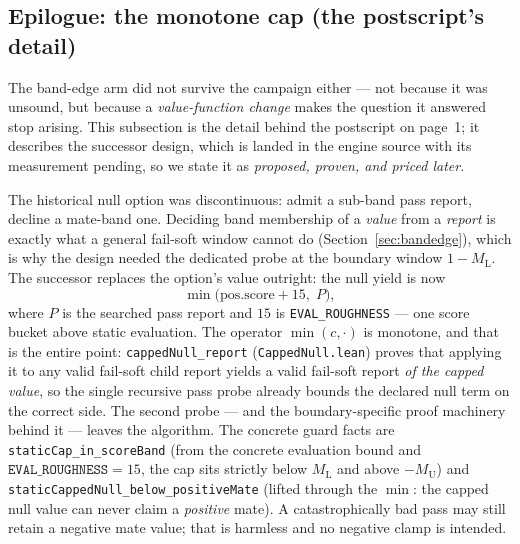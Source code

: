 \documentclass[11pt]{article}
\newcommand{\MU}{M_{\mathrm{U}}}    %
\newcommand{\ML}{M_{\mathrm{L}}}    %
\theoremstyle{plain}
\theoremstyle{definition}
\theoremstyle{remark}
\begin{document}
\subsection{Epilogue: the monotone cap (the postscript's detail)}
\label{sec:cappednull}

The band-edge arm did not survive the campaign either --- not because
it was unsound, but because a \emph{value-function change} makes the
question it answered stop arising.  This subsection is the detail
behind the postscript on page~1; it describes the successor design,
which is landed in the engine source with its measurement pending, so
we state it as \emph{proposed, proven, and priced later}.

The historical null option was discontinuous: admit a sub-band pass
report, decline a mate-band one.  Deciding band membership of a
\emph{value} from a \emph{report} is exactly what a general fail-soft
window cannot do (Section~\ref{sec:bandedge}), which is why the design
needed the dedicated probe at the boundary window $1 - \ML$.  The
successor replaces the option's value outright: the null yield is now
\[
  \min\bigl(\mathrm{pos.score} + 15,\; P\bigr),
\]
where $P$ is the searched pass report and $15$ is
\texttt{EVAL\_ROUGHNESS} --- one score bucket above static
evaluation.  The operator $\min(c, \cdot)$ is monotone, and that is
the entire point: \texttt{cappedNull\_report}
(\texttt{CappedNull.lean}) proves that applying it to any valid
fail-soft child report yields a valid fail-soft report \emph{of the
capped value}, so the single recursive pass probe already bounds the
declared null term on the correct side.  The second probe --- and the
boundary-specific proof machinery behind it --- leaves the algorithm.
The concrete guard facts are
\texttt{staticCap\_in\_scoreBand} (from the concrete evaluation bound
and $\texttt{EVAL\_ROUGHNESS} = 15$, the cap sits strictly below $\ML$
and above $-\MU$) and \texttt{staticCappedNull\_below\_positiveMate}
(lifted through the $\min$: the capped null value can never claim a
\emph{positive} mate).  A catastrophically bad pass may still retain a
negative mate value; that is harmless and no negative clamp is
intended.
\end{document}
